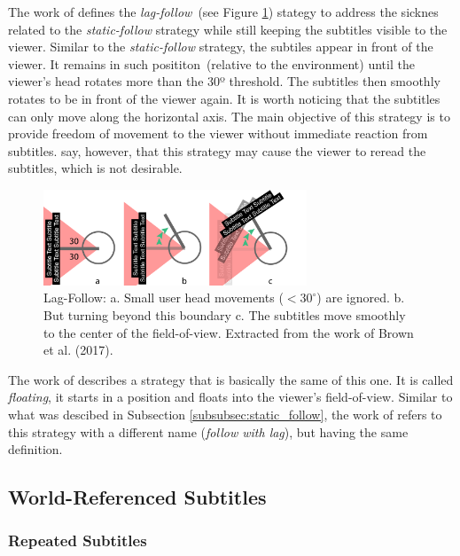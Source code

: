 The work of \cite{brown_subtitles_2017} defines the \emph{lag-follow}~(see Figure \ref{fig:lag_follow}) stategy to address the sicknes related to the \emph{static-follow} strategy while still keeping the subtitles visible to the viewer. Similar to the \emph{static-follow} strategy, the subtiles appear in front of the viewer. It remains in such posititon~(relative to the environment) until the viewer's head rotates more than the 30º threshold. The subtitles then smoothly rotates to be in front of the viewer again. It is worth noticing that the subtitles can only move along the horizontal axis. The main objective of this strategy is to provide freedom of movement to the viewer without immediate reaction from subtitles. \cite{brown_subtitles_2017} say, however, that this strategy may cause the viewer to reread the subtitles, which is not desirable.

\begin{figure}[!ht]
    \centering
    \includegraphics[width=0.7\textwidth]{img/video360/lag-follow.png}
    \caption{Lag-Follow: a. Small user head movements ($<30^{\circ}$) are ignored. b. But turning beyond this boundary c. The subtitles move smoothly to the center of the field-of-view. Extracted from the work of Brown et al. (2017).}
    \label{fig:lag_follow}
\end{figure}

The work of \cite{matos_dynamic_2018} describes a strategy that is basically the same of this one. It is called \emph{floating}, it starts in a position and floats into the viewer's field-of-view. Similar to what was descibed in Subsection \ref{subsubsec:static_follow}, the work of \cite{montagud_culture_2020} refers to this strategy with a different name (\emph{follow with lag}), but having the same definition.

\subsection{World-Referenced Subtitles}
\label{subsec:world_referenced}

\subsubsection{Repeated Subtitles}
\label{subsubsection:repeated_subtitles}

